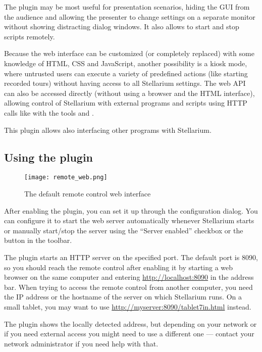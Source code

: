 The plugin may be most useful for presentation scenarios, hiding the GUI from the 
audience and allowing the presenter to change settings on a separate monitor 
without showing distracting dialog windows. It also allows to start and stop 
scripts remotely. 

Because the web interface can be customized (or completely 
replaced) with some knowledge of HTML, CSS and JavaScript, another possibility 
is a kiosk mode, where untrusted users can execute a variety of predefined 
actions (like starting recorded tours) without having access to all Stellarium 
settings. The web API can also be accessed directly (without using a browser 
and the HTML interface), allowing control of Stellarium with external programs 
and scripts using HTTP calls like with the tools  and .

This plugin allows also interfacing other programs with Stellarium. 

\subsection{Using the plugin}
\label{sec:plugins:RemoteControl:using}

\begin{figure}[h]
\centering\texttt{[image: remote\_web.png]}
\caption{The default remote control web interface}
\label{fig:plugins:RemoteControl:using}
\end{figure}

After enabling the plugin, you can set it up through the configuration dialog. 
You can configure it to start the web server automatically whenever Stellarium starts 
or manually start/stop the server using the ``Server enabled'' checkbox or the 
button  in the toolbar.

The plugin starts an HTTP server on the specified port. The default port is 
8090, so you should reach the remote control after enabling it by starting 
a web browser on the same computer and entering \url{http://localhost:8090} in the 
address bar. When trying to access the remote control from another computer, 
you need the IP address or the hostname of the server on which Stellarium runs. 
On a small tablet, you may want to use \url{http://myserver:8090/tablet7in.html} instead.

The plugin shows the locally detected address, but depending on your network or 
if you need external access you might need to use a different one 
--- contact your network administrator if you need help with that.

